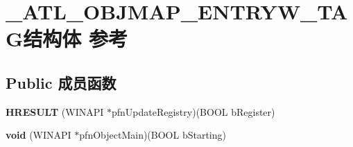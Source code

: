 \hypertarget{struct___a_t_l___o_b_j_m_a_p___e_n_t_r_y_w___t_a_g}{}\section{\+\_\+\+A\+T\+L\+\_\+\+O\+B\+J\+M\+A\+P\+\_\+\+E\+N\+T\+R\+Y\+W\+\_\+\+T\+A\+G结构体 参考}
\label{struct___a_t_l___o_b_j_m_a_p___e_n_t_r_y_w___t_a_g}
\subsection*{Public 成员函数}
\begin{DoxyCompactItemize}
\item 
\mbox{\label{struct___a_t_l___o_b_j_m_a_p___e_n_t_r_y_w___t_a_g_a3544d7948a5f81cef91981a88cc46bc8}} 
{\bfseries H\+R\+E\+S\+U\+LT} (W\+I\+N\+A\+PI $\ast$pfn\+Update\+Registry)(B\+O\+OL b\+Register)
\item 
\mbox{\label{struct___a_t_l___o_b_j_m_a_p___e_n_t_r_y_w___t_a_g_a962930678a1298925f9376b8629b862a}} 
{\bfseries void} (W\+I\+N\+A\+PI $\ast$pfn\+Object\+Main)(B\+O\+OL b\+Starting)
\end{DoxyCompactItemize}
